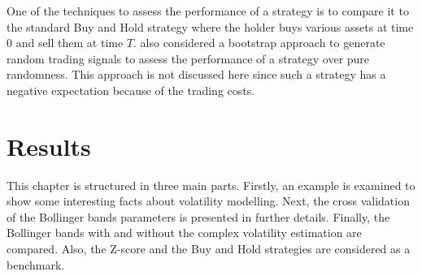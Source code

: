 \documentclass[11pt,a4,twosided,singlespacing,titlepagenumber=on]{scrreprt}
\numberwithin{equation}{chapter} %
\theoremstyle{remark}
\begin{document}
One of the techniques to assess the performance of a strategy is to compare it to the standard Buy and Hold strategy where the holder buys various assets at time $0$ and sell them at time $T$. \cite{gatev2006} also considered a bootstrap approach to generate random trading signals to assess the performance of a strategy over pure randomness. This approach is not discussed here since such a strategy has a negative expectation because of the trading costs.

\chapter{Results}
This chapter is structured in three main parts. Firstly, an example is examined to show some interesting facts about volatility modelling. Next, the cross validation of the Bollinger bands parameters is presented in further details. Finally, the Bollinger bands with and without the complex volatility estimation are compared. Also, the Z-score and the Buy and Hold strategies are considered as a benchmark.
\end{document}
